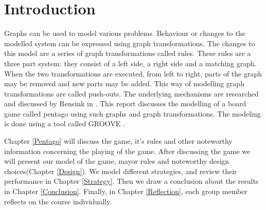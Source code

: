 \section{Introduction}
\label{Introduction}
Graphs can be used to model various problems.
Behaviour or changes to the modelled system can be expressed using graph transformations.
The changes to this model are a series of graph transformations called rules.
These rules are a three part system: they consist of a left side, a right side and a matching graph.
When the two transformations are executed, from left to right, parts of the graph may be removed and new parts may be added.
This way of modelling graph transformations are called push-outs.
The underlying mechanisms are researched and discussed by Rensink in \cite{Rensink2006}.
This report discusses the modelling of a board game called pentago using such graphs and graph transformations. 
The modeling is done using a tool called GROOVE \cite{tool-groove}.

\vspace{6pt}

Chapter \ref{Pentago} will discuss the game, it's rules and other noteworthy information concerning the playing of the game. 
After discussing the game we will present our model of the game, mayor rules and noteworthy design choices(Chapter \ref{Design}).
We model different strategies, and review their performance in Chapter \ref{Strategy}. Then we draw a conclusion about the results in Chapter \ref{Conclusion}.
Finally, in Chapter \ref{Reflection}, each group member reflects on the course individually.
